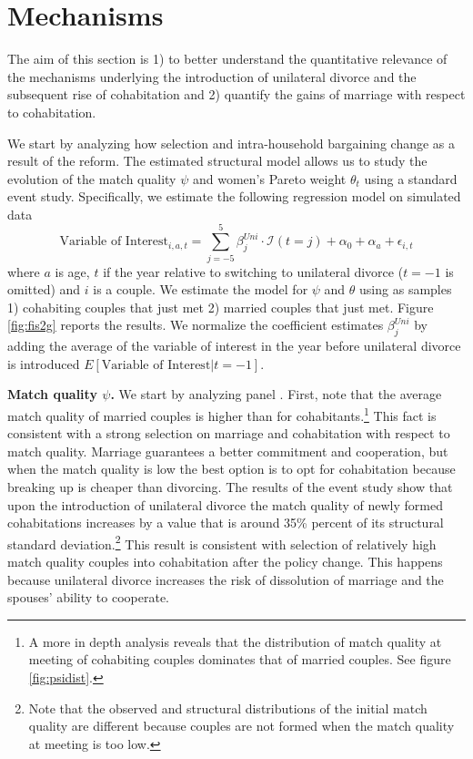 \documentclass[12pt]{article}
\numberwithin{table}{section}
\begin{document}
\section{Mechanisms}
The aim of this section is 1) to better understand the quantitative relevance of the mechanisms underlying the introduction of unilateral divorce and the subsequent rise of cohabitation and 2) quantify the gains of marriage with respect to cohabitation.

 We start by analyzing how selection and intra-household bargaining change as a result of the reform. The estimated structural model allows us to study the evolution of the match quality $\psi$ and women's Pareto weight $\theta_t$ using a standard event study. Specifically, we estimate the following regression model on simulated data
\begin{equation}\label{eq:ev_stud}
\text{Variable of Interest}_{i,a,t}=\sum_{j=-5}^{5}\beta^{Uni}_j\cdot\mathcal{I}(t=j)+\alpha_{0}+\alpha_{a}+\epsilon_{i,t}
\end{equation}
where $a$ is age, $t$ if the year relative to switching to unilateral divorce ($t=-1$ is omitted) and $i$ is a couple. We estimate the model for $\psi$ and $\theta$ using as samples 1) cohabiting couples that just met 2) married couples that just met.
Figure \ref{fig:fis2g} reports the results. We normalize the coefficient estimates $\beta^{Uni}_j$ by adding the average of the variable of interest in the year before unilateral divorce is introduced $E[\text{Variable of Interest}|t=-1]$. 

\textbf{Match quality $\psi$.} We start by analyzing panel . First, note that the average match quality of married couples is higher than for cohabitants.\footnote{A more in depth analysis reveals that the distribution of match quality at meeting of cohabiting couples dominates that of married couples. See figure \ref{fig:psidist}.} This fact is consistent with a strong selection on marriage and cohabitation with respect to match quality. Marriage guarantees a better commitment and cooperation, but when the match quality is low the best option is to opt for cohabitation because breaking up is cheaper than divorcing. The results of the event study show that upon the introduction of unilateral divorce the match quality of newly formed cohabitations increases by a value that is around 35\% percent of its structural standard deviation.\footnote{Note that the observed and structural distributions of the initial match quality are different because couples are not formed when the match quality at meeting is too low.} This result is consistent with selection of relatively high match quality couples into cohabitation after the policy change. This happens because unilateral divorce increases the risk of dissolution of marriage and the spouses' ability to cooperate. 
\end{document}
